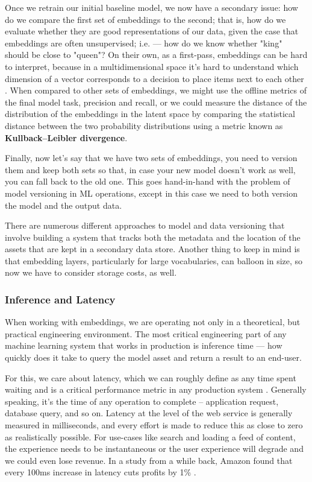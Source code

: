 \documentclass[11pt, table]{diazessay} %
\begin{document}
\begin{sloppypar}
Once we retrain our initial baseline model, we now have a secondary issue: how do we compare the first set of embeddings to the second; that is, how do we evaluate whether they are good representations of our data, given the case that embeddings are often unsupervised; i.e. --- how do we know whether "king" should be close to "queen"? On their own, as a first-pass, embeddings can be hard to interpret, because in a multidimensional space it's hard to understand which dimension of a vector corresponds to a decision to place items next to each other \citep{simhi2022interpreting}.  When compared to other sets of embeddings, we might use the offline metrics of the final model task, precision and recall, or we could measure the distance of the distribution of the embeddings in the latent space by comparing the statistical distance between the two probability distributions using a metric known as \textbf{Kullback–Leibler divergence}.

Finally, now let's say that we have two sets of embeddings, you need to version them and keep both sets so that, in case your new model doesn't work as well, you can fall back to the old one. This goes hand-in-hand with the problem of model versioning in ML operations, except in this case we need to both version the model and the output data.

There are numerous different approaches to model and data versioning that involve building a system that tracks both the metadata and the location of the assets that are kept in a secondary data store. Another thing to keep in mind is that embedding layers, particularly for large vocabularies, can balloon in size, so now we have to consider storage costs, as well.


\subsubsection{Inference and Latency}

When working with embeddings, we are operating not only in a theoretical, but practical engineering environment. The most critical engineering part of any machine learning system that works in production is inference time --- how quickly does it take to query the model asset and return a result to an end-user.

For this, we care about latency, which we can roughly define as any time spent waiting and is a critical performance metric in any production system \citep{gregg2014systems}. Generally speaking, it's the time of any operation to complete -- application request, database query, and so on. Latency at the level of the web service is generally measured in milliseconds, and every effort is made to reduce this as close to zero as realistically possible. For use-cases like search and loading a feed of content, the experience needs to be instantaneous or the user experience will degrade and we could even lose revenue. In a study from a while back, Amazon found that every 100ms increase in latency cuts profits by 1\%  \citep{flach2013reducing}.


\end{sloppypar}
\end{document}
